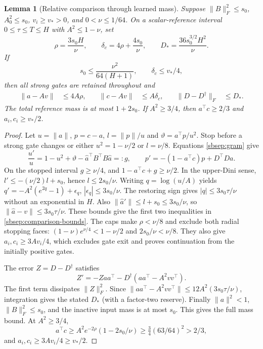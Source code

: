 \documentclass{article} %
\theoremstyle{plain}
\newtheorem{lemma}[theorem]{Lemma}
\theoremstyle{definition}
\theoremstyle{remark}
\begin{document}
\begin{lemma}[Relative comparison through learned mass]
\label{sbsep:relative-comparison}
Suppose $\|B\|_F^2\le s_0$, $A_0^2\le s_0$, $v_i\ge v_*>0$,
and $0<\nu\le1/64$. On a scalar-reference interval $0\le\tau\le T\le H$
with $A^2\le1-\nu$, set
\[
 \rho=\frac{3s_0H}{\nu},\qquad
 \delta_c=4\rho+\frac{4s_0}{\nu},\qquad
 D_* =\frac{36s_0^{3/2}H^2}{\nu}.
\]
If
\begin{equation}\label{sbsep:comparison-caps}
 s_0\le\frac{\nu^2}{64(H+1)},\qquad \delta_c\le v_*/4,
\end{equation}
then all strong gates are retained throughout and
\begin{align}
 \|a-Av\|&\le4A\rho,&\quad\|c-Av\|&\le A\delta_c,
 &\quad\|D-D^\dagger\|_F&\le D_* .\label{sbsep:comparison-bounds}
\end{align}
The total reference mass is at most $1+2s_0$. If $A^2\ge3/4$, then
$a^\top c\ge2/3$ and $a_i,c_i\ge v_*/2$.
\end{lemma}
\begin{proof}
Let $u=\|a\|$, $p=c-a$, $l=\|p\|/u$ and
$\vartheta=a^\top p/u^2$. Stop before a strong gate changes or either
$u^2=1-\nu/2$ or $l=\nu/8$. Equations \eqref{sbsep:gram} give
\[
 \frac{u'}u=1-u^2+\vartheta-\widehat a^\top B^\top B\widehat a=:g,
 \qquad p'=-(1-a^\top c)p+D^\top Da.
\]
On the stopped interval $g\ge\nu/4$, and
$1-a^\top c+g\ge\nu/2$. In the upper-Dini sense,
$l'\le-(\nu/2)l+s_0$, hence $l\le2s_0/\nu$.
Writing $q=\log(u/A)$ yields
$q'=-A^2(e^{2q}-1)+\epsilon_q$, $|\epsilon_q|\le3s_0/\nu$.
The restoring sign gives $|q|\le3s_0\tau/\nu$ without an exponential
in $H$. Also $\|\widehat a'\|\le l+s_0\le3s_0/\nu$, so
$\|\widehat a-v\|\le3s_0\tau/\nu$.
These bounds give the first two inequalities in
\eqref{sbsep:comparison-bounds}. The caps make
$\rho<\nu/8$ and exclude both radial stopping faces:
$(1-\nu)e^{\nu/4}<1-\nu/2$ and $2s_0/\nu<\nu/8$.
They also give $a_i,c_i\ge3Av_i/4$, which excludes gate exit and
proves continuation from the initially positive gates.

The error $Z=D-D^\dagger$ satisfies
\[
 Z'=-Zaa^\top-D^\dagger(aa^\top-A^2vv^\top).
\]
The first term dissipates $\|Z\|_F^2$.
Since $\|aa^\top-A^2vv^\top\|\le12A^2(3s_0\tau/\nu)$,
integration gives the stated $D_*$ (with a factor-two reserve).
Finally $\|a\|^2<1$, $\|B\|_F^2\le s_0$, and the inactive input
mass is at most $s_0$. This gives the full mass bound. At $A^2\ge3/4$,
\[
 a^\top c\ge A^2e^{-2\rho}(1-2s_0/\nu)
 \ge\tfrac34(63/64)^2>2/3,
\]
and $a_i,c_i\ge3Av_i/4\ge v_*/2$.
\end{proof}
\end{document}
